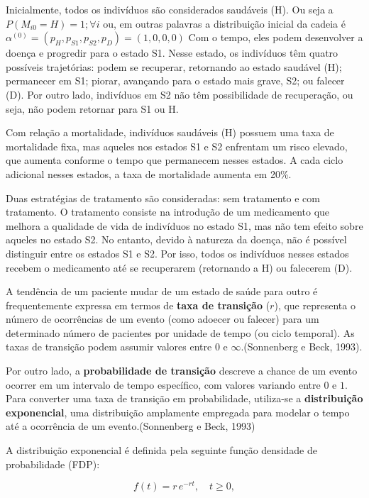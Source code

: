 \documentclass[12pt, a4paper, openany]{book}
\numberwithin{equation}{chapter}
\numberwithin{table}{chapter}
\numberwithin{figure}{chapter}
\theoremstyle{break}
\begin{document}
Inicialmente, todos os indivíduos são considerados saudáveis (H). Ou seja a $P(M_{i0} = H) = 1 ;  \forall i $ ou, em outras palavras a distribuição inicial da cadeia é $\alpha^{(0)} = (p_H,p_{S1},p_{S2},p_{D}) = (1,0,0,0) $
Com o tempo, eles podem desenvolver a doença e progredir para o estado S1. Nesse estado, os indivíduos têm quatro possíveis trajetórias: podem se recuperar, retornando ao estado saudável (H); permanecer em S1; piorar, avançando para o estado mais grave, S2; ou falecer (D). Por outro lado, indivíduos em S2 não têm possibilidade de recuperação, ou seja, não podem retornar para S1 ou H.

Com relação a mortalidade, indivíduos saudáveis (H) possuem uma taxa de mortalidade fixa, mas aqueles nos estados S1 e S2 enfrentam um risco elevado, que aumenta conforme o tempo que permanecem nesses estados. A cada ciclo adicional nesses estados, a taxa de mortalidade aumenta em 20\%. 

Duas estratégias de tratamento são consideradas: sem tratamento e com tratamento. O tratamento consiste na introdução de um medicamento que melhora a qualidade de vida de indivíduos no estado S1, mas não tem efeito sobre aqueles no estado S2. No entanto, devido à natureza da doença, não é possível distinguir entre os estados S1 e S2. Por isso, todos os indivíduos nesses estados recebem o medicamento até se recuperarem (retornando a H) ou falecerem (D).





A tendência de um paciente mudar de um estado de saúde para outro é frequentemente expressa em termos de \textbf{taxa de transição} (\( r \)), que representa o número de ocorrências de um evento (como adoecer ou falecer) para um determinado número de pacientes por unidade de tempo (ou ciclo temporal). As taxas de transição podem assumir valores entre \( 0 \) e \( \infty \).(Sonnenberg e Beck, 1993).

Por outro lado, a \textbf{probabilidade de transição} descreve a chance de um evento ocorrer em um intervalo de tempo específico, com valores variando entre \( 0 \) e \( 1 \). Para converter uma taxa de transição em probabilidade, utiliza-se a \textbf{distribuição exponencial}, uma distribuição amplamente empregada para modelar o tempo até a ocorrência de um evento.(Sonnenberg e Beck, 1993)

A distribuição exponencial é definida pela seguinte função densidade de probabilidade (FDP):

\[
f(t) = r \, e^{-r t}, \quad t \geq 0,
\]
\end{document}
